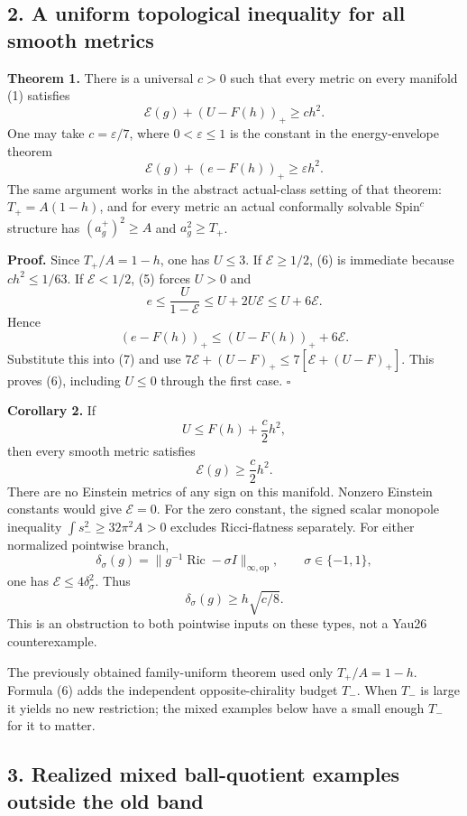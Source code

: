 \documentclass[
  11pt,
]{article}
\begin{document}
\hypertarget{a-uniform-topological-inequality-for-all-smooth-metrics}{%
\subsection{2. A uniform topological inequality for all smooth
metrics}\label{a-uniform-topological-inequality-for-all-smooth-metrics}}

\textbf{Theorem 1.} There is a universal \(c>0\) such that every metric
on every manifold (1) satisfies \[
 \boxed{\mathcal E(g)+(U-F(h))_+\ge c h^2.}
 \tag{6}
\] One may take \(c=\varepsilon/7\), where \(0<\varepsilon\le1\) is the
constant in the energy-envelope theorem \[
 \mathcal E(g)+(e-F(h))_+\ge\varepsilon h^2.
 \tag{7}
\] The same argument works in the abstract actual-class setting of that
theorem: \(T_+=A(1-h)\), and for every metric an actual conformally
solvable Spin\(^c\) structure has \((a_g^+)^2\ge A\) and
\(a_g^2\ge T_+\).

\textbf{Proof.} Since \(T_+/A=1-h\), one has \(U\le3\). If
\(\mathcal E\ge1/2\), (6) is immediate because \(c h^2\le1/63\). If
\(\mathcal E<1/2\), (5) forces \(U>0\) and \[
 e\le\frac{U}{1-\mathcal E}
 \le U+2U\mathcal E\le U+6\mathcal E.
\] Hence \[
 (e-F(h))_+\le(U-F(h))_++6\mathcal E.
\] Substitute this into (7) and use
\(7\mathcal E+(U-F)_+\le7[\mathcal E+(U-F)_+]\). This proves (6),
including \(U\le0\) through the first case. \(\square\)

\textbf{Corollary 2.} If \[
 U\le F(h)+\frac c2 h^2,
 \tag{8}
\] then every smooth metric satisfies \[
 \mathcal E(g)\ge\frac c2 h^2.
 \tag{9}
\] There are no Einstein metrics of any sign on this manifold. Nonzero
Einstein constants would give \(\mathcal E=0\). For the zero constant,
the signed scalar monopole inequality \(\int s_-^2\ge32\pi^2A>0\)
excludes Ricci-flatness separately. For either normalized pointwise
branch, \[
 \delta_\sigma(g)=\|g^{-1}\operatorname{Ric}-\sigma I\|_{\infty,\mathrm{op}},
 \qquad\sigma\in\{-1,1\},
\] one has \(\mathcal E\le4\delta_\sigma^2\). Thus \[
 \boxed{\delta_\sigma(g)\ge h\sqrt{c/8}.}
 \tag{10}
\] This is an obstruction to both pointwise inputs on these types, not a
Yau26 counterexample.

The previously obtained family-uniform theorem used only \(T_+/A=1-h\).
Formula (6) adds the independent opposite-chirality budget \(T_-\). When
\(T_-\) is large it yields no new restriction; the mixed examples below
have a small enough \(T_-\) for it to matter.

\hypertarget{realized-mixed-ball-quotient-examples-outside-the-old-band}{%
\subsection{3. Realized mixed ball-quotient examples outside the old
band}\label{realized-mixed-ball-quotient-examples-outside-the-old-band}}
\end{document}
